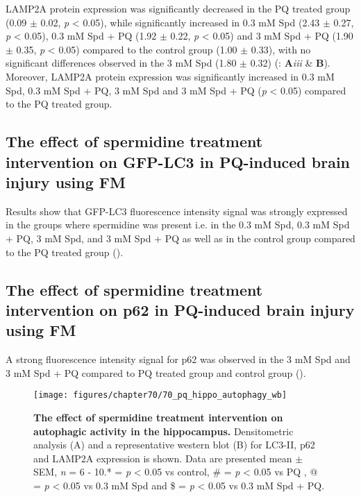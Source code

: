 LAMP2A protein expression was significantly decreased in the PQ treated group (0.09 $\pm$ 0.02, \textit{p} < 0.05), while significantly increased in 0.3 mM Spd (2.43 $\pm$ 0.27, \textit{p} < 0.05), 0.3 mM Spd + PQ (1.92 $\pm$ 0.22, \textit{p} < 0.05) and 3 mM Spd + PQ (1.90 $\pm$ 0.35, \textit{p} < 0.05) compared to the control group (1.00 $\pm$ 0.33), with no significant differences observed in the 3 mM Spd (1.80 $\pm$ 0.32) (: \textbf{A}\textit{iii} \& \textbf{B}). Moreover, LAMP2A protein expression was significantly increased in 0.3 mM Spd, 0.3 mM Spd + PQ, 3 mM Spd and 3 mM Spd + PQ (\textit{p} < 0.05) compared to the PQ treated group.

\subsection{The effect of spermidine treatment intervention on GFP-LC3  in PQ-induced brain injury using FM}
Results show that GFP-LC3 fluorescence intensity signal was strongly expressed in the groups where spermidine was present i.e. in the 0.3 mM Spd, 0.3 mM Spd + PQ, 3 mM Spd, and 3 mM Spd + PQ as well as in the control group compared to the PQ treated group ().

\subsection{The effect of spermidine treatment intervention on p62 in PQ-induced brain injury using FM}
A strong fluorescence intensity signal for p62 was observed in the 3 mM Spd and 3 mM Spd + PQ compared to PQ treated group and control group ().

\begin{landscape}
\begin{figure}[!htbp]
\center
  \texttt{[image: figures/chapter70/70\_pq\_hippo\_autophagy\_wb]}
  \caption[The effect of spermidine treatment intervention on autophagic activity in the hippocampus]{\textbf{The effect of spermidine treatment intervention on autophagic activity in the hippocampus.} Densitometric analysis (A) and a representative western blot (B) for LC3-II, p62 and LAMP2A expression is shown. Data are presented  mean $\pm$ SEM, \textit{n} = 6 - 10.* = \textit{p} < 0.05 vs control, \# = \textit{p} < 0.05 vs PQ , @ = \textit{p} < 0.05 vs 0.3 mM Spd and \$ = \textit{p} < 0.05 vs 0.3 mM Spd + PQ.}
  \label{fig:70_pq_hippo_autophagy_wb}
\end{figure} 
\end{landscape}

